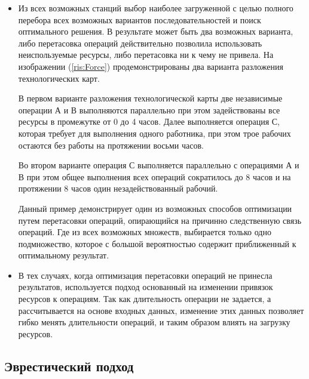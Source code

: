 \begin{itemize}
    \item Из всех возможных станций выбор наиболее загруженной с целью полного перебора всех возможных вариантов последовательностей и поиск оптимального решения. В результате может быть два возможных варианта, либо перетасовка операций действительно позволила использовать неиспользуемые ресурсы, либо перетасовка ни к чему не привела. На изображении (\ref{ris:Force}) продемонстрированы два варианта разложения технологических карт. 
    
    В первом варианте разложения технологической карты две независимые операции А и В выполняются параллельно при этом задействованы все ресурсы в промежутке от 0 до 4 часов. Далее выполняется операция С, которая требует для выполнения одного работника, при этом трое рабочих остаются без работы на протяжении восьми часов.
    
    Во втором варианте операция С выполняется параллельно с операциями А и В при этом общее выполнения всех операций сократилось до 8 часов и на протяжении 8 часов один незадействованный рабочий.
    
    Данный пример демонстрирует один из возможных способов оптимизации путем перетасовки операций, опирающийся на причинно следственную связь операций.  Где из всех возможных множеств, выбирается только одно подмножество, которое с большой вероятностью содержит приближенный к оптимальному результат.
    
    \item В тех случаях, когда оптимизация перетасовки операций не принесла результатов, используется подход основанный на изменении привязок ресурсов к операциям. Так как длительность операции не задается, а рассчитывается на основе входных данных, изменение этих данных позволяет гибко менять длительности операций, и таким образом влиять на загрузку ресурсов. 

\end{itemize}


\subsection{Эврестический подход}

